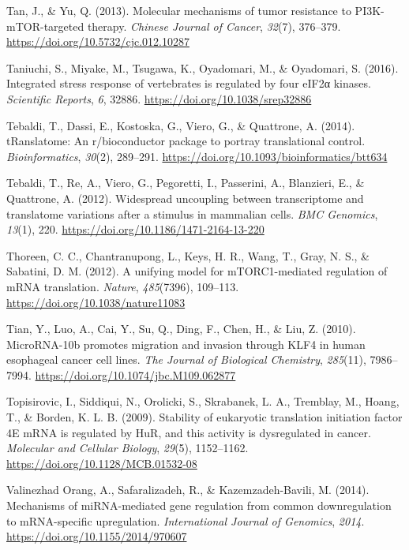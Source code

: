 \documentclass[12pt,openany]{book}
\begin{document}
\hypertarget{ref-Tan2013}{}
Tan, J., \& Yu, Q. (2013). Molecular mechanisms of tumor resistance to
PI3K-mTOR-targeted therapy. \emph{Chinese Journal of Cancer},
\emph{32}(7), 376--379. \url{https://doi.org/10.5732/cjc.012.10287}

\hypertarget{ref-Taniuchi2016}{}
Taniuchi, S., Miyake, M., Tsugawa, K., Oyadomari, M., \& Oyadomari, S.
(2016). Integrated stress response of vertebrates is regulated by four
eIF2α kinases. \emph{Scientific Reports}, \emph{6}, 32886.
\url{https://doi.org/10.1038/srep32886}

\hypertarget{ref-Tebaldi2014}{}
Tebaldi, T., Dassi, E., Kostoska, G., Viero, G., \& Quattrone, A.
(2014). tRanslatome: An r/bioconductor package to portray translational
control. \emph{Bioinformatics}, \emph{30}(2), 289--291.
\url{https://doi.org/10.1093/bioinformatics/btt634}

\hypertarget{ref-Tebaldi2012}{}
Tebaldi, T., Re, A., Viero, G., Pegoretti, I., Passerini, A., Blanzieri,
E., \& Quattrone, A. (2012). Widespread uncoupling between transcriptome
and translatome variations after a stimulus in mammalian cells.
\emph{BMC Genomics}, \emph{13}(1), 220.
\url{https://doi.org/10.1186/1471-2164-13-220}

\hypertarget{ref-Thoreen2012}{}
Thoreen, C. C., Chantranupong, L., Keys, H. R., Wang, T., Gray, N. S.,
\& Sabatini, D. M. (2012). A unifying model for mTORC1-mediated
regulation of mRNA translation. \emph{Nature}, \emph{485}(7396),
109--113. \url{https://doi.org/10.1038/nature11083}

\hypertarget{ref-Tian2010}{}
Tian, Y., Luo, A., Cai, Y., Su, Q., Ding, F., Chen, H., \& Liu, Z.
(2010). MicroRNA-10b promotes migration and invasion through KLF4 in
human esophageal cancer cell lines. \emph{The Journal of Biological
Chemistry}, \emph{285}(11), 7986--7994.
\url{https://doi.org/10.1074/jbc.M109.062877}

\hypertarget{ref-Topisirovic2009}{}
Topisirovic, I., Siddiqui, N., Orolicki, S., Skrabanek, L. A., Tremblay,
M., Hoang, T., \& Borden, K. L. B. (2009). Stability of eukaryotic
translation initiation factor 4E mRNA is regulated by HuR, and this
activity is dysregulated in cancer. \emph{Molecular and Cellular
Biology}, \emph{29}(5), 1152--1162.
\url{https://doi.org/10.1128/MCB.01532-08}

\hypertarget{ref-ValinezhadOrang2014}{}
Valinezhad Orang, A., Safaralizadeh, R., \& Kazemzadeh-Bavili, M.
(2014). Mechanisms of miRNA-mediated gene regulation from common
downregulation to mRNA-specific upregulation. \emph{International
Journal of Genomics}, \emph{2014}.
\url{https://doi.org/10.1155/2014/970607}
\end{document}
